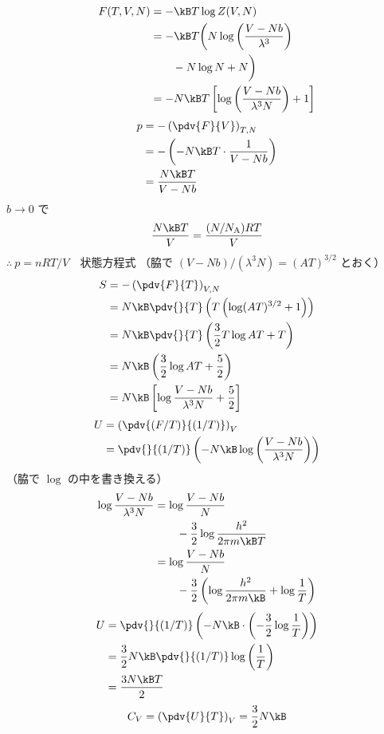 \begin{align*}
F(T,V,N)&=-\kB T\log Z(V,N)\\
&=-\kB T\biggl(N\log\left(\frac{V-Nb}{\lambda^{3}}\right)\\
&\qquad-N\log N+N\biggr)\\
&=-N\kB T\left[\log\left(\frac{V-Nb}{\lambda^{3}N}\right)+1\right]
\end{align*}
\begin{align*}
p&=-\left(\pdv{F}{V}\right)_{T,N}\\
&=-\left(-N\kB T\cdot\frac{1}{V-Nb}\right)\\
&=\frac{N\kB T}{V-Nb}
\end{align*}
$b\to0$ で
\[ \frac{N\kB T}{V}=\frac{(N/N_{\mathrm{A}})RT}{V} \]
$\therefore\ p=nRT/V$　状態方程式
（脇で $(V-Nb)/(\lambda^{3}N)=(AT)^{3/2}$ とおく）
\begin{align*}
S&=-\left(\pdv{F}{T}\right)_{V,N}\\
&=N\kB\pdv{}{T}\left(T\left(\log(AT)^{3/2}+1\right)\right)\\
&=N\kB\pdv{}{T}\left(\frac{3}{2}T\log AT+T\right)\\
&=N\kB\left(\frac{3}{2}\log AT+\frac{5}{2}\right)\\
&=N\kB\left[\log\frac{V-Nb}{\lambda^{3}N}+\frac{5}{2}\right]
\end{align*}
\begin{align*}
U&=\left(\pdv{(F/T)}{(1/T)}\right)_{V}\\
&=\pdv{}{(1/T)}\left(-N\kB\log\left(\frac{V-Nb}{\lambda^{3}N}\right)\right)
\end{align*}
（脇で $\log$ の中を書き換える）
\begin{align*}
\log\frac{V-Nb}{\lambda^{3}N}&=\log\frac{V-Nb}{N}\\
&\qquad-\frac{3}{2}\log\frac{h^{2}}{2\pi m\kB T}\\
&=\log\frac{V-Nb}{N}\\
&\qquad-\frac{3}{2}\left(\log\frac{h^{2}}{2\pi m\kB}+\log\frac{1}{T}\right)
\end{align*}
\begin{align*}
U&=\pdv{}{(1/T)}\left(-N\kB\cdot\left(-\frac{3}{2}\log\frac{1}{T}\right)\right)\\
&=\frac{3}{2}N\kB\pdv{}{(1/T)}\log\left(\frac{1}{T}\right)\\
&=\frac{3N\kB T}{2}
\end{align*}
\[ C_{V}=\left(\pdv{U}{T}\right)_{V}=\frac{3}{2}N\kB \]

